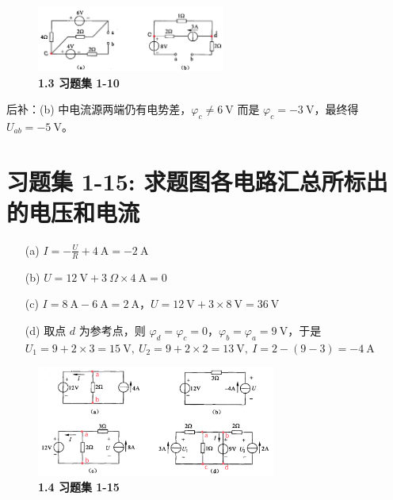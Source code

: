 \documentclass[UTF8]{report}
\theoremstyle{MyLineTheoremStyle} %
\theoremstyle{MyBlockTheoremStyle} %
\theoremstyle{MySubsubsectionStyle} %
\begin{document}
\begin{figure}[H]\centering
\includegraphics[width=0.55\textwidth]{assets/1/9dda9e5f333b8cb7f498d15c015e5fd0.png}
\caption{\bfseries 1.3 习题集 1-10}
\end{figure}
{\par\color{gray}\small
后补：(b) 中电流源两端仍有电势差，$\varphi_c \ne 6 \ \mathrm{V}$ 而是 $ \varphi_c = -3\ \mathrm{V} $，最终得 $U_{ab} = -5 \ \mathrm{V}$。
\par}


\section{习题集 1-15: 求题图各电路汇总所标出的电压和电流}

\begin{enumerate}
    \item[(a)] $I = -\frac{U}{R} + 4\ \mathrm{A} = -2 \ \mathrm{A}$
    \item[(b)] $U =12 \ \mathrm{V} + 3\ \Omega \times 4 \ \mathrm{A} = 0 $ 
    \item[(c)] $I = 8 \ \mathrm{A} - 6\ \mathrm{A} = 2 \ \mathrm{A}$，$ U = 12 \ \mathrm{V} + 3\times8 \ \mathrm{V} = 36 \ \mathrm{V}$ 
    \item[(d)] 取点 $ d $ 为参考点，则 $\varphi_d = \varphi_c = 0$，$\varphi_b = \varphi_a = 9 \ \mathrm{V}$，于是 $U_1 = 9 + 2\times3 = 15\ \mathrm{V},\ U_2 = 9 + 2\times 2 = 13 \ \mathrm{V},\ I =2 -  (9-3) = - 4 \ \mathrm{A}$
\end{enumerate}

\begin{figure}[H]\centering
\includegraphics[width=0.7\textwidth]{assets/1/b82ef4f3b4efd9d0ee903e5f19353345.png}
\caption{\bfseries 1.4 习题集 1-15}
\end{figure}
\end{document}
